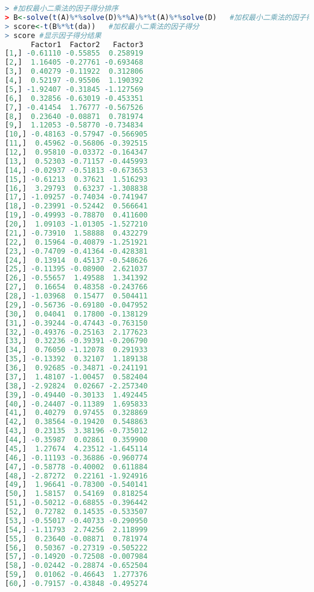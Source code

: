 \documentclass[11pt,a4paper,oneside]{book}
\begin{document}
\begin{lstlisting}[language=r]
> #加权最小二乘法的因子得分排序
> B<-solve(t(A)%*%solve(D)%*%A)%*%t(A)%*%solve(D)   #加权最小二乘法的因子得分矩阵
> score<-t(B%*%t(da))   #加权最小二乘法的因子得分
> score #显示因子得分结果
      Factor1  Factor2   Factor3
[1,] -0.61110 -0.55855  0.258919
[2,]  1.16405 -0.27761 -0.693468
[3,]  0.40279 -0.11922  0.312806
[4,]  0.52197 -0.95506  1.190392
[5,] -1.92407 -0.31845 -1.127569
[6,]  0.32856 -0.63019 -0.453351
[7,] -0.41454  1.76777 -0.567526
[8,]  0.23640 -0.08871  0.781974
[9,]  1.12053 -0.58770 -0.734834
[10,] -0.48163 -0.57947 -0.566905
[11,]  0.45962 -0.56806 -0.392515
[12,]  0.95810 -0.03372 -0.164347
[13,]  0.52303 -0.71157 -0.445993
[14,] -0.02937 -0.51813 -0.673653
[15,] -0.61213  0.37621  1.516293
[16,]  3.29793  0.63237 -1.308838
[17,] -1.09257 -0.74034 -0.741947
[18,] -0.23991 -0.52442  0.566641
[19,] -0.49993 -0.78870  0.411600
[20,]  1.09103 -1.01305 -1.527210
[21,] -0.73910  1.58888  0.432279
[22,]  0.15964 -0.40879 -1.251921
[23,] -0.74709 -0.41364 -0.428381
[24,]  0.13914  0.45137 -0.548626
[25,] -0.11395 -0.08900  2.621037
[26,] -0.55657  1.49588  1.341392
[27,]  0.16654  0.48358 -0.243766
[28,] -1.03968  0.15477  0.504411
[29,] -0.56736 -0.69180 -0.047952
[30,]  0.04041  0.17800 -0.138129
[31,] -0.39244 -0.47443 -0.763150
[32,] -0.49376 -0.25163  2.177623
[33,]  0.32236 -0.39391 -0.206790
[34,]  0.76050 -1.12078  0.291933
[35,] -0.13392  0.32107  1.189138
[36,]  0.92685 -0.34871 -0.241191
[37,]  1.48107 -1.00457  0.582404
[38,] -2.92824  0.02667 -2.257340
[39,] -0.49440 -0.30133  1.492445
[40,] -0.24407 -0.11389  1.695833
[41,]  0.40279  0.97455  0.328869
[42,]  0.38564 -0.19420  0.548863
[43,]  0.23135  3.38196 -0.735012
[44,] -0.35987  0.02861  0.359900
[45,]  1.27674  4.23512 -1.645114
[46,] -0.11193 -0.36886 -0.960774
[47,] -0.58778 -0.40002  0.611884
[48,] -2.87272  0.22161 -1.924916
[49,]  1.96641 -0.78300 -0.540141
[50,]  1.58157  0.54169  0.818254
[51,] -0.50212 -0.68855 -0.396442
[52,]  0.72782  0.14535 -0.533507
[53,] -0.55017 -0.40733 -0.290950
[54,] -1.11793  2.74256  2.118999
[55,]  0.23640 -0.08871  0.781974
[56,]  0.50367 -0.27319 -0.505222
[57,] -0.14920 -0.72508 -0.007984
[58,] -0.02442 -0.28874 -0.652504
[59,]  0.01062 -0.46643  1.277376
[60,] -0.79157 -0.43848 -0.495274
\end{lstlisting}
\end{document}
